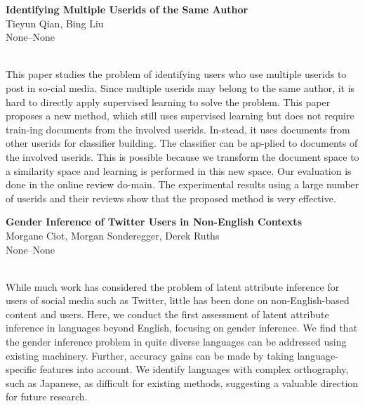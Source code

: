 \documentclass[twoside,makeidx]{book}
\renewcommand{\normalsize}{\fontsize{8}{9}\selectfont}
\renewcommand{\small}{\fontsize{7}{8}\selectfont}
\begin{document}
\par\vspace{2em}\noindent%
\begin{minipage}{\linewidth}%
\begin{center}
\textbf{\normalsize Identifying Multiple Userids of the Same Author}\\
\normalsize  Tieyun Qian,  Bing Liu\\
{\small None--None}\\
\end{center}
\end{minipage}\\[0.5em]
\nopagebreak%
\noindent%
{\small This paper studies the problem of identifying users who use multiple userids to post in so-cial media. Since multiple userids may belong to the same author, it is hard to directly apply supervised learning to solve the problem. This paper proposes a new method, which still uses supervised learning but does not require train-ing documents from the involved userids. In-stead, it uses documents from other userids for classifier building. The classifier can be ap-plied to documents of the involved userids. This is possible because we transform the document space to a similarity space and learning is performed in this new space. Our evaluation is done in the online review do-main. The experimental results using a large number of userids and their reviews show that the proposed method is very effective.}
\par\vspace{2em}\noindent%
\begin{minipage}{\linewidth}%
\begin{center}
\textbf{\normalsize Gender Inference of Twitter Users in Non-English Contexts}\\
\normalsize  Morgane Ciot,  Morgan Sonderegger,  Derek Ruths\\
{\small None--None}\\
\end{center}
\end{minipage}\\[0.5em]
\nopagebreak%
\noindent%
{\small While much work has considered the problem of latent attribute inference for users of social media such as Twitter, little has been done on non-English-based content and users.  Here, we conduct the first assessment of latent attribute inference in languages beyond English, focusing on gender inference. We find that the gender inference problem in quite diverse languages can be addressed using existing machinery. Further, accuracy gains can be made by taking language-specific features into account.  We identify languages with complex orthography, such as Japanese, as difficult for existing methods, suggesting a valuable direction for future research.}
\end{document}

